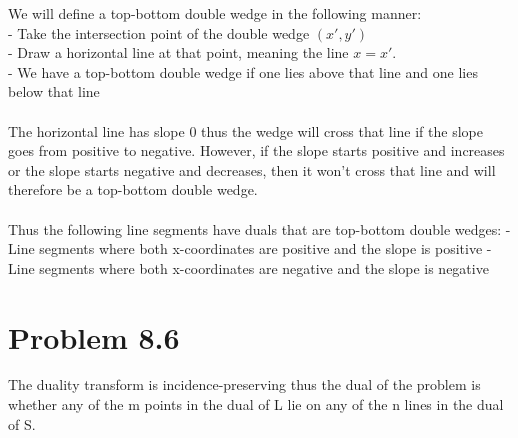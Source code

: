 \documentclass[11pt,psfig]{article}
\begin{document}
We will define a top-bottom double wedge in the following manner:
\\
- Take the intersection point of the double wedge $(x',y')$
\\
- Draw a horizontal line at that point, meaning the line $x=x'$. 
\\
- We have a top-bottom double wedge if one lies above that line and one lies below that line
\\
\\
The horizontal line has slope $0$ thus the wedge will cross that line if the slope goes from positive to negative. However, if the slope starts positive and increases or the slope starts negative and decreases, then it won't cross that line and will therefore be a top-bottom double wedge. 
\\
\\
Thus the following line segments have duals that are top-bottom double wedges:
- Line segments where both x-coordinates are positive and the slope is positive
- Line segments where both x-coordinates are negative and the slope is negative

\section*{Problem 8.6}

The duality transform is incidence-preserving thus the dual of the problem is whether any of the m points in the dual of L lie on any of the n lines in the dual of S. 
\end{document}

